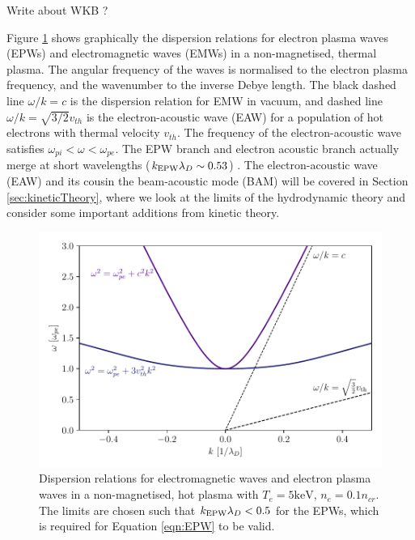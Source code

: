 Write about WKB ? 

Figure \ref{fig:EMW_EPW_disp} shows graphically the dispersion relations for electron plasma waves (\acrshort{EPW}s) and electromagnetic waves (\acrshort{EMW}s) in a non-magnetised, thermal plasma. The angular frequency of the waves is normalised to the electron plasma frequency, and the wavenumber to the inverse Debye length. The black dashed line $\omega / k = c$ is the dispersion relation for \acrshort{EMW} in vacuum, and dashed line $\omega / k = \sqrt{3/2}v_{th}$ is the electron-acoustic wave (\acrshort{EAW}) for a population of hot electrons with thermal velocity $v_{th}$. The frequency of the electron-acoustic wave satisfies $\omega_{pi} < \omega < \omega_{pe}$. The \acrshort{EPW} branch and electron acoustic branch actually merge at short wavelengths ($k_\mathrm{EPW}\lambda_D\sim 0.53$) \citep{Rose2003}. The electron-acoustic wave (\acrshort{EAW}) and its cousin the beam-acoustic mode (\acrshort{BAM}) will be covered in Section \ref{sec:kineticTheory}, where we look at the limits of the hydrodynamic theory and consider some important additions from kinetic theory.


\begin{figure}[ht]
   \centering
    \includegraphics[width=0.9\columnwidth]{Chapters/C2_Theory/EPW_EMW_dispersion.pdf}
    \caption{Dispersion relations for electromagnetic waves and electron plasma waves in a non-magnetised, hot plasma with $T_e= 5\text{keV}$, $n_e=0.1n_{cr}$. The limits are chosen such that $k_\mathrm{EPW}\lambda_D < 0.5$ for the \acrshort{EPW}s, which is required for Equation \ref{eqn:EPW} to be valid.}
    \label{fig:EMW_EPW_disp}
\end{figure}{}




